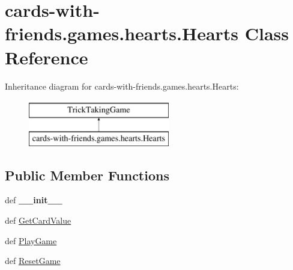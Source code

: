 \hypertarget{classcards-with-friends_1_1games_1_1hearts_1_1_hearts}{\section{cards-\/with-\/friends.games.\-hearts.\-Hearts Class Reference}
\label{classcards-with-friends_1_1games_1_1hearts_1_1_hearts}
}
Inheritance diagram for cards-\/with-\/friends.games.\-hearts.\-Hearts\-:\begin{figure}[H]
\begin{center}
\leavevmode
\includegraphics[height=2.000000cm]{classcards-with-friends_1_1games_1_1hearts_1_1_hearts}
\end{center}
\end{figure}
\subsection*{Public Member Functions}
\begin{DoxyCompactItemize}
\item 
\hypertarget{classcards-with-friends_1_1games_1_1hearts_1_1_hearts_a936f6d5d7717c76980b709e0d575c80c}{def {\bfseries \-\_\-\-\_\-init\-\_\-\-\_\-}}\label{classcards-with-friends_1_1games_1_1hearts_1_1_hearts_a936f6d5d7717c76980b709e0d575c80c}

\item 
def \hyperlink{classcards-with-friends_1_1games_1_1hearts_1_1_hearts_aaf67a22977dd621ac3a21663f5702563}{Get\-Card\-Value}
\item 
def \hyperlink{classcards-with-friends_1_1games_1_1hearts_1_1_hearts_ac2cd6b81283c961c434ccea4a6e22889}{Play\-Game}
\item 
def \hyperlink{classcards-with-friends_1_1games_1_1hearts_1_1_hearts_a456f051fffc1e97b24c99bcd3573eda9}{Reset\-Game}
\end{DoxyCompactItemize}
